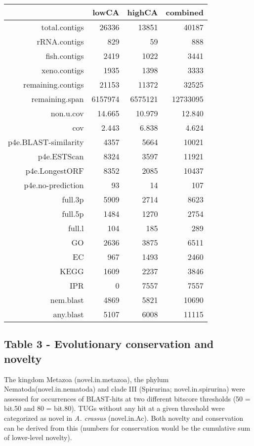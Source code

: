 \documentclass[10pt]{bmc_article}
\newenvironment{bmcformat}{\begin{raggedright}\baselineskip20pt\sloppy\setboolean{publ}{false}}{\end{raggedright}\baselineskip20pt\sloppy}
\begin{document}
\begin{bmcformat}
\begin{table}[ht]
\begin{center}
\begin{tabular}{rrrr}
  \hline
 & lowCA & highCA & combined \\ 
  \hline
total.contigs & 26336 & 13851 & 40187 \\ 
  rRNA.contigs & 829 & 59 & 888 \\ 
  fish.contigs & 2419 & 1022 & 3441 \\ 
  xeno.contigs & 1935 & 1398 & 3333 \\ 
  remaining.contigs & 21153 & 11372 & 32525 \\ 
  remaining.span & 6157974 & 6575121 & 12733095 \\ 
  non.u.cov & 14.665 & 10.979 & 12.840 \\ 
  cov & 2.443 & 6.838 & 4.624 \\ 
  p4e.BLAST-similarity & 4357 & 5664 & 10021 \\ 
  p4e.ESTScan & 8324 & 3597 & 11921 \\ 
  p4e.LongestORF & 8352 & 2085 & 10437 \\ 
  p4e.no-prediction & 93 & 14 & 107 \\ 
  full.3p & 5909 & 2714 & 8623 \\ 
  full.5p & 1484 & 1270 & 2754 \\ 
  full.l & 104 & 185 & 289 \\ 
  GO & 2636 & 3875 & 6511 \\ 
  EC & 967 & 1493 & 2460 \\ 
  KEGG & 1609 & 2237 & 3846 \\ 
  IPR & 0 & 7557 & 7557 \\ 
  nem.blast & 4869 & 5821 & 10690 \\ 
  any.blast & 5107 & 6008 & 11115 \\ 
   \hline
\end{tabular}
\end{center}
\end{table}
\subsection*{Table 3 - Evolutionary conservation and novelty}

The kingdom Metazoa (novel.in.metazoa), the phylum
Nematoda(novel.in.nematoda) and clade III (Spirurina;
novel.in.spirurina) were assessed for occurrences of BLAST-hits at two
different bitscore thresholds (50 = bit.50 and 80 = bit.80). TUGs
without any hit at a given threshold were categorized as novel in
\textit{A. crassus} (novel.in.Ac). Both novelty and conservation can be
derived from this (numbers for conservation would be the cumulative
sum of lower-level novelty).


\end{bmcformat}
\end{document}
